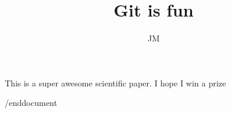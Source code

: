 \documentclass[10pt]{article}
\author{JM}
\title{Git is fun}
\begin{document}
        \maketitle

        This is a super awesome scientific paper.
        I hope I win a prize

/end{document}
\end{document}
